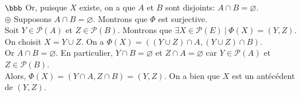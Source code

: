 \documentclass[11pt]{article}
\begin{document}
\begin{exercice}{$\bbb$}{}
    Or, puisque $X$ existe, on a que $A$ et $B$ sont disjoints:  $A \cap B = \varnothing$.\\[0.1cm]
    $\circledcirc$ Supposons $A \cap B = \varnothing$. Montrons que $\Phi$ est surjective.\\
    Soit $Y \in \mathcal{P}(A)$ et $Z \in \mathcal{P}(B)$. Montrons que $\exists X \in \mathcal{P}(E) ~ | ~ \Phi(X) = (Y, Z)$.\\
    On choisit $X = Y \cup Z$. On a $\Phi(X)=((Y \cup Z) \cap A, (Y \cup Z) \cap B)$.\\
    Or $A \cap B = \varnothing$. En particulier, $Y \cap B = \varnothing$ et $Z\cap A = \varnothing$ car $Y\in\mathcal{P}(A)$ et $Z \in \mathcal{P}(B)$.\\
    Alors, $\varPhi(X)=(Y \cap A, Z \cap B)=(Y,Z)$. On a bien que $X$ est un antécédent de $(Y,Z)$.
\end{exercice}
\end{document}
